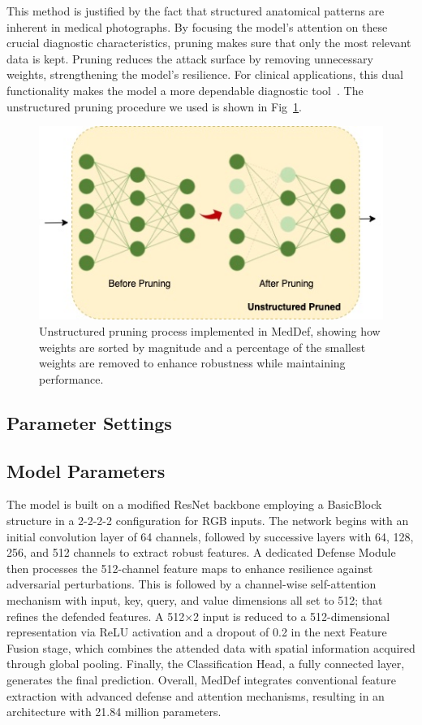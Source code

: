 \documentclass[preprint,12pt]{elsarticle}
\begin{document}
This method is justified by the fact that structured anatomical patterns are inherent in medical photographs. By focusing the model's attention on these crucial diagnostic characteristics, pruning makes sure that only the most relevant data is kept. Pruning reduces the attack surface by removing unnecessary weights, strengthening the model's resilience. For clinical applications, this dual functionality makes the model a more dependable diagnostic tool~\cite{Liebenwein21}. The unstructured pruning procedure we used is shown in Fig~\ref{fig:pruning}.

\begin{figure}[!t]
\centerline{\includegraphics[width=\columnwidth]{fig/fig4.jpg}}
\caption{Unstructured pruning process implemented in MedDef, showing how weights are sorted by magnitude and a percentage of the smallest weights are removed to enhance robustness while maintaining performance.}
\label{fig:pruning}
\end{figure}

\subsection{Parameter Settings}
\label{sec:parameters}

\subsection{Model Parameters}
The model is built on a modified ResNet backbone employing a BasicBlock structure in a 2-2-2-2 configuration for RGB inputs. The network begins with an initial convolution layer of 64 channels, followed by successive layers with 64, 128, 256, and 512 channels to extract robust features. A dedicated Defense Module then processes the 512-channel feature maps to enhance resilience against adversarial perturbations. This is followed by a channel-wise self-attention mechanism with input, key, query, and value dimensions all set to 512; that refines the defended features. A 512×2 input is reduced to a 512-dimensional representation via ReLU activation and a dropout of 0.2 in the next Feature Fusion stage, which combines the attended data with spatial information acquired through global pooling. Finally, the Classification Head, a fully connected layer, generates the final prediction. Overall, MedDef integrates conventional feature extraction with advanced defense and attention mechanisms, resulting in an architecture with 21.84 million parameters.
\end{document}

